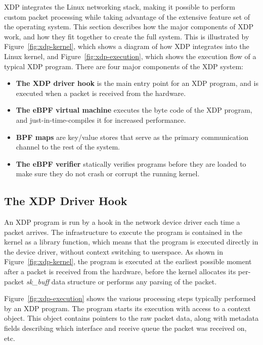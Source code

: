 \documentclass[sigconf]{acmart}
\begin{document}
XDP integrates the Linux networking stack, making it possible to perform custom
packet processing while taking advantage of the extensive feature set of the
operating system. This section describes how the major components of XDP work,
and how they fit together to create the full system. This is illustrated by
Figure~\ref{fig:xdp-kernel}, which shows a diagram of how XDP integrates into
the Linux kernel, and Figure~\ref{fig:xdp-execution}, which shows the execution
flow of a typical XDP program. There are four major components of the XDP
system:

\begin{itemize}
\item \textbf{The XDP driver hook} is the main entry point for an XDP program,
  and is executed when a packet is received from the hardware.

\item \textbf{The eBPF virtual machine} executes the byte code of the XDP
  program, and just-in-time-compiles it for increased performance.

\item \textbf{BPF maps} are key/value stores that serve as the primary
  communication channel to the rest of the system.

\item \textbf{The eBPF verifier} statically verifies programs before they are
  loaded to make sure they do not crash or corrupt the running kernel.
\end{itemize}


\subsection{The XDP Driver Hook}
\label{sec:prog-model}


An XDP program is run by a hook in the network device driver each time a packet
arrives. The infrastructure to execute the program is contained in the kernel as
a library function, which means that the program is executed directly in the
device driver, without context switching to userspace. As shown in
Figure~\ref{fig:xdp-kernel}, the program is executed at the earliest possible
moment after a packet is received from the hardware, before the kernel allocates
its per-packet \emph{sk\_buff} data structure or performs any parsing of the
packet.

Figure~\ref{fig:xdp-execution} shows the various processing steps typically
performed by an XDP program. The program starts its execution with access to a
context object. This object contains pointers to the raw packet data, along with
metadata fields describing which interface and receive queue the packet was
received on, etc.
\end{document}
